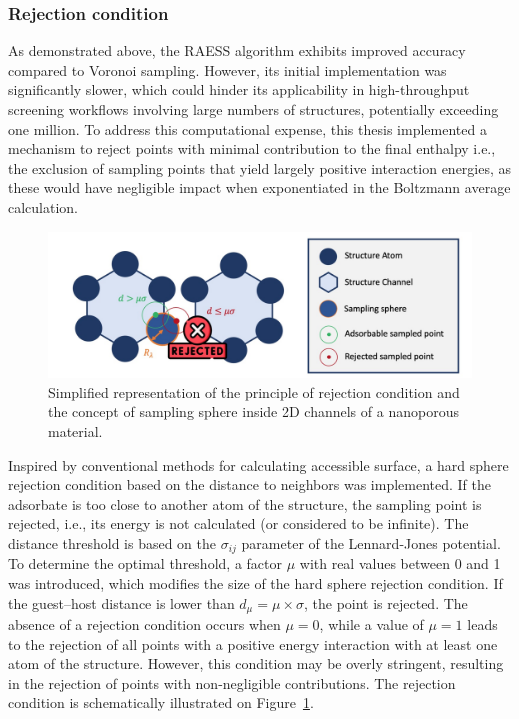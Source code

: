 \documentclass[main]{subfiles}
\begin{document}
\subsubsection{Rejection condition}\label{sct:rejection_condition}

As demonstrated above, the RAESS algorithm exhibits improved accuracy compared to Voronoi sampling. However, its initial implementation was significantly slower, which could hinder its applicability in high-throughput screening workflows involving large numbers of structures, potentially exceeding one million. To address this computational expense, this thesis implemented a mechanism to reject points with minimal contribution to the final enthalpy i.e., the exclusion of sampling points that yield largely positive interaction energies, as these would have negligible impact when exponentiated in the Boltzmann average calculation.

\begin{figure}[ht]
\centering
  \includegraphics[width=\linewidth]{figures/3-fastsim/rejection_sampling_sphere.jpg}
  \caption{Simplified representation of the principle of rejection condition and the concept of sampling sphere inside 2D channels of a nanoporous material.}\label{fgr:feature}
\end{figure}

Inspired by conventional methods for calculating accessible surface, a hard sphere rejection condition based on the distance to neighbors was implemented. If the adsorbate is too close to another atom of the structure, the sampling point is rejected, i.e., its energy is not calculated (or considered to be infinite). The distance threshold is based on the $\sigma_{ij}$ parameter of the Lennard-Jones potential. To determine the optimal threshold, a factor $\mu$ with real values between 0 and 1 was introduced, which modifies the size of the hard sphere rejection condition. If the guest--host distance is lower than $d_{\mu} = \mu \times \sigma$, the point is rejected. The absence of a rejection condition occurs when $\mu = 0$, while a value of $\mu = 1$ leads to the rejection of all points with a positive energy interaction with at least one atom of the structure. However, this condition may be overly stringent, resulting in the rejection of points with non-negligible contributions. The rejection condition is schematically illustrated on Figure~\ref{fgr:feature}.
\end{document}

